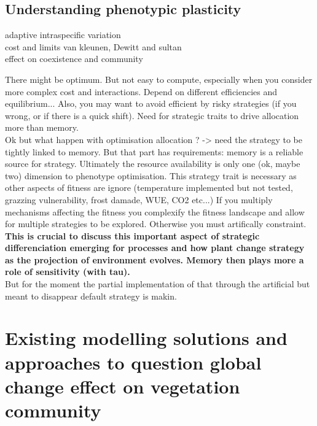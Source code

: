 \subsection{Understanding phenotypic plasticity}
adaptive intraspecific variation\\
cost and limits van kleunen, Dewitt and sultan \\
effect on coexistence and community\\


\begin{fullwidth}
\begin{tcolorbox}[title=Molecular basis of phenotypic plasticity] %

There might be optimum. But not easy to compute, especially when you consider more complex cost and interactions. Depend on different efficiencies and equilibrium... Also, you may want to avoid efficient by risky strategies (if you wrong, or if there is a quick shift). Need for strategic traits to drive allocation more than memory.\\
Ok but what happen with optimisation allocation ? -> need the strategy to be tightly linked to memory. But that part has requirements: memory is a reliable source for strategy. Ultimately the resource availability is only one (ok, maybe two) dimension to phenotype optimisation. This strategy trait is necessary as other aspects of fitness are ignore (temperature implemented but not tested, grazzing vulnerability, frost damade, WUE, CO2 etc...) If you multiply mechanisms affecting the fitness you complexify the fitness landscape and allow for multiple strategies to be explored. Otherwise you must artifically constraint. \\

\indent \textbf{This is crucial to discuss this important aspect of strategic differenciation emerging for processes and how plant change strategy as the projection of environment evolves. Memory then plays more a role of sensitivity (with tau).}\\
But for the moment the partial implementation of that through the artificial but meant to disappear default strategy is makin.\\

\end{tcolorbox}
\end{fullwidth}
 

\section{Existing  modelling solutions and approaches to question global change effect on vegetation community}

